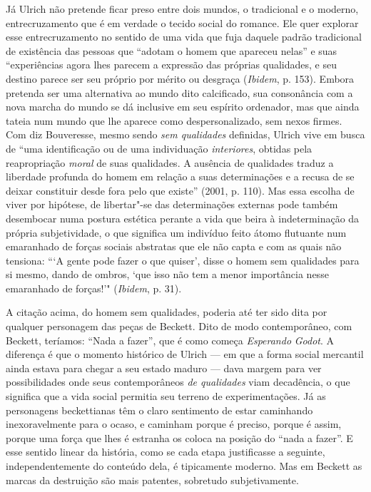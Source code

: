 Já Ulrich não pretende ficar preso entre dois mundos, o tradicional e o
moderno, entrecruzamento que é em verdade o tecido social do romance.
Ele quer explorar esse entrecruzamento no sentido de uma vida que fuja
daquele padrão tradicional de existência das pessoas que ``adotam o
homem que apareceu nelas'' e suas ``experiências agora lhes parecem a
expressão das próprias qualidades, e seu destino parece ser seu próprio
por mérito ou desgraça (\emph{Ibidem}, p. 153). Embora pretenda ser uma
alternativa ao mundo dito calcificado, sua consonância com a nova marcha
do mundo se dá inclusive em seu espírito ordenador, mas que ainda tateia
num mundo que lhe aparece como despersonalizado, sem nexos firmes. Com
diz Bouveresse, mesmo sendo \emph{sem qualidades} definidas,
Ulrich vive em busca de ``uma identificação ou de uma individuação
\emph{interiores}, obtidas pela reapropriação \emph{moral} de suas
qualidades. A ausência de qualidades traduz a liberdade profunda do
homem em relação a suas determinações e a recusa de se deixar constituir
desde fora pelo que existe'' (2001, p. 110). Mas essa escolha de viver
por hipótese, de libertar"-se das determinações externas pode também
desembocar numa postura estética perante a vida que beira à
indeterminação da própria subjetividade, o que significa um indivíduo
feito átomo flutuante num emaranhado de forças sociais abstratas que ele
não capta e com as quais não tensiona: ```A gente pode fazer o que
quiser', disse o homem sem qualidades para si mesmo, dando de ombros,
`que isso não tem a menor importância nesse emaranhado de forças!'"
(\emph{Ibidem}, p. 31).

A citação acima, do homem sem qualidades, poderia até ter sido dita por
qualquer personagem das peças de Beckett. Dito de modo contemporâneo,
com Beckett, teríamos: ``Nada a fazer'', que é como começa
\emph{Esperando} \emph{Godot}. A diferença é que o momento histórico de
Ulrich --- em que a forma social mercantil ainda estava para chegar a
seu estado maduro --- dava margem para ver possibilidades onde seus
contemporâneos \emph{de qualidades} viam decadência, o que significa que
a vida social permitia seu terreno de experimentações. Já as personagens
beckettianas têm o claro sentimento de estar caminhando inexoravelmente
para o ocaso, e caminham porque é preciso, porque é assim, porque uma
força que lhes é estranha os coloca na posição do ``nada a fazer''. E
esse sentido linear da história, como se cada etapa justificasse a
seguinte, independentemente do conteúdo dela, é tipicamente moderno. Mas
em Beckett as marcas da destruição são mais patentes, sobretudo
subjetivamente.

